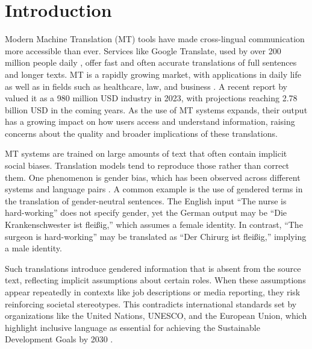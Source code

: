 \chapter{Introduction}
    Modern Machine Translation (MT) tools have made cross-lingual communication more accessible than ever. Services like Google Translate, used by over 200 million people daily \parencite{pratesAssessingGenderBias2019,shresthaExploringGenderBiases2022}, offer fast and often accurate translations of full sentences and longer texts. MT is a rapidly growing market, with applications in daily life as well as in fields such as healthcare, law, and business \parencite{kapplAreAllSpanish2025}. A recent report by \textcite{skyquestMachineTranslationMT2025} valued it as a 980 million USD industry in 2023, with projections reaching 2.78 billion USD in the coming years. As the use of MT systems expands, their output has a growing impact on how users access and understand information, raising concerns about the quality and broader implications of these translations.
    
    MT systems are trained on large amounts of text that often contain implicit social biases. Translation models tend to reproduce those rather than correct them. One phenomenon is gender bias, which has been observed across different systems and language pairs \parencite{choMeasuringGenderBias2019,soundararajanInvestigatingGenderBias2024,smacchiaDoesAIReflect2024}. A common example is the use of gendered terms in the translation of gender-neutral sentences. The English input “The nurse is hard-working” does not specify gender, yet the German output may be “Die Krankenschwester ist fleißig,” which assumes a female identity. In contrast, “The surgeon is hard-working” may be translated as “Der Chirurg ist fleißig,” implying a male identity. 
    
    Such translations introduce gendered information that is absent from the source text, reflecting implicit assumptions about certain roles. When these assumptions appear repeatedly in contexts like job descriptions or media reporting, they risk reinforcing societal stereotypes. This contradicts international standards set by organizations like the United Nations, UNESCO, and the European Union, which highlight inclusive language as essential for achieving the Sustainable Development Goals by 2030 \parencite{sczesnyCanGenderFairLanguage2016,unitednationsAchieveGenderEquality2023}.

